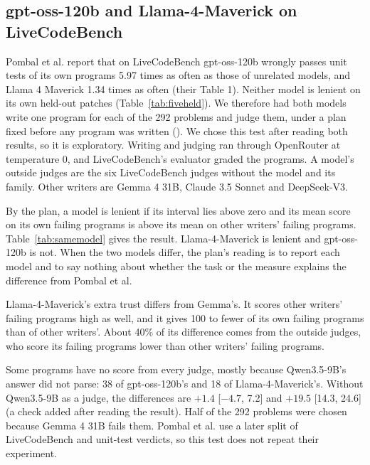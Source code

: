 \documentclass[10pt,letterpaper]{article}
\begin{document}
\subsection*{gpt-oss-120b and Llama-4-Maverick on LiveCodeBench}

Pombal et al. report that on LiveCodeBench gpt-oss-120b wrongly passes unit tests of its own programs 5.97 times as %
often as those of unrelated models, and Llama 4 Maverick 1.34 times as often (their Table 1). Neither model is lenient
on its own held-out patches (Table~\ref{tab:fiveheld}). We therefore had both models write one program for each of the
292 problems and judge them, under a plan fixed before any program was written (). We
chose this test after reading both results, so it is exploratory. Writing and judging ran through OpenRouter at
temperature 0, and LiveCodeBench's evaluator graded the programs. A model's outside judges are the six LiveCodeBench
judges without the model and its family. Other writers are Gemma 4 31B, Claude 3.5 Sonnet and DeepSeek-V3.

By the plan, a model is lenient if its interval lies above zero and its mean score on its own failing programs is above
its mean on other writers' failing programs. Table~\ref{tab:samemodel} gives the result. Llama-4-Maverick is lenient and
gpt-oss-120b is not. When the two models differ, the plan's reading is to report each model and to say nothing about
whether the task or the measure explains the difference from Pombal et al.

Llama-4-Maverick's extra trust differs from Gemma's. It scores other writers' failing programs high as well, and
it gives 100 to fewer of its own failing programs than of other writers'. About 40\% of its difference comes from the
outside judges, who score its failing programs lower than other writers' failing programs.

Some programs have no score from every judge, mostly because Qwen3.5-9B's answer did not parse: 38 of gpt-oss-120b's and
18 of Llama-4-Maverick's. Without Qwen3.5-9B as a judge, the differences are $+1.4$ [$-4.7$, 7.2] and $+19.5$ [14.3, 24.6] (a
check added after reading the result). Half of the 292 problems were chosen because Gemma 4 31B fails them. Pombal et al.
use a later split of LiveCodeBench and unit-test verdicts, so this test does not repeat their experiment.
\end{document}
